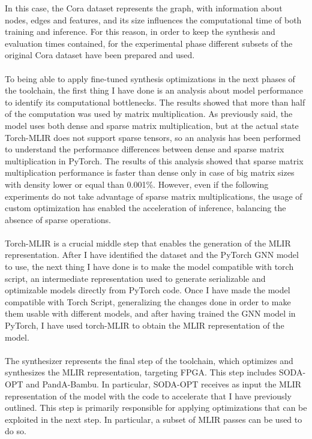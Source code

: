 \documentclass{article}
\begin{document}
In this case, the Cora dataset represents the graph, with information about nodes, edges and features, and its size influences the computational time of both training and inference.
For this reason, in order to keep the synthesis and evaluation times contained, for the experimental phase different subsets of the original Cora dataset have been prepared and used.
\\
\\
\noindent
To being able to apply fine-tuned synthesis optimizations in the next phases of the toolchain, the first thing I have done is an analysis about model performance to identify its computational bottlenecks.
The results showed that more than half of the computation was used by matrix multiplication.
As previously said, the model uses both dense and sparse matrix multiplication, but at the actual state Torch-MLIR does not support sparse tensors, so an analysis has been performed to understand the performance differences between dense and sparse matrix multiplication in PyTorch.
The results of this analysis showed that sparse matrix multiplication performance is faster than dense only in case of big matrix sizes with density lower or equal than 0.001\%.
However, even if the following experiments do not take advantage of sparse matrix multiplications,
the usage of custom optimization has enabled the acceleration of inference, balancing the absence of sparse operations.
\\
\\
\noindent
Torch-MLIR is a crucial middle step that enables the generation of the MLIR representation.
After I have identified the dataset and the PyTorch GNN model to use, the next thing I have done is to make the model compatible with torch script, an intermediate representation used to generate serializable and optimizable models directly from PyTorch code.
Once I have made the model compatible with Torch Script, generalizing the changes done in order to make them usable with different models, and after having trained the GNN model in PyTorch, I have used torch-MLIR to obtain the MLIR representation of the model.
\\
\\
\noindent
The synthesizer represents the final step of the toolchain, which optimizes and synthesizes the MLIR representation, targeting FPGA. This step includes SODA-OPT and PandA-Bambu.
In particular, SODA-OPT receives as input the MLIR representation of the model with the code to accelerate that I have previously outlined. This step is primarily responsible for applying optimizations that can be exploited in the next step. In particular, a subset of MLIR passes can be used to do so.
\end{document}
